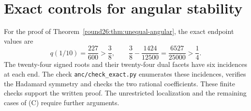 \section{Exact controls for angular stability}\label{round26:app:angular}
For the proof of Theorem~\ref{round26:thm:unequal-angular}, the exact endpoint values are
\[
 q(1/10)=\frac{227}{600}>\frac38,
 \qquad \frac38-\frac{1424}{12500}=\frac{6527}{25000}>\frac14.
\]
The twenty-four signed roots and their twenty-four dual facets have six incidences at each end. The check \texttt{anc/check\_exact.py} enumerates these incidences, verifies the Hadamard symmetry and checks the two rational coefficients. These finite checks support the written proof. The unrestricted localization and the remaining cases of (C) require further arguments.
